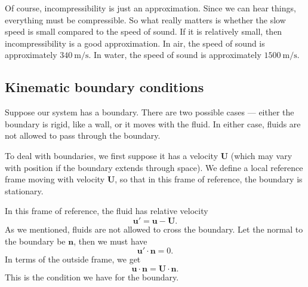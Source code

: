 \documentclass[a4paper]{article}
\begin{document}
Of course, incompressibility is just an approximation. Since we can hear things, everything must be compressible. So what really matters is whether the slow speed is small compared to the speed of sound. If it is relatively small, then incompressibility is a good approximation. In air, the speed of sound is approximately $\SI{340}{\meter\per\second}$. In water, the speed of sound is approximately $\SI{1500}{\meter\per\second}$.

\subsection{Kinematic boundary conditions}
Suppose our system has a boundary. There are two possible cases --- either the boundary is rigid, like a wall, or it moves with the fluid. In either case, fluids are not allowed to pass through the boundary.

To deal with boundaries, we first suppose it has a velocity $\mathbf{U}$ (which may vary with position if the boundary extends through space). We define a local reference frame moving with velocity $\mathbf{U}$, so that in this frame of reference, the boundary is stationary.

In this frame of reference, the fluid has relative velocity
\[
  \mathbf{u}' = \mathbf{u} - \mathbf{U}.
\]
As we mentioned, fluids are not allowed to cross the boundary. Let the normal to the boundary be $\mathbf{n}$, then we must have
\[
  \mathbf{u}' \cdot \mathbf{n} = 0.
\]
In terms of the outside frame, we get
\[
  \mathbf{u}\cdot \mathbf{n} = \mathbf{U} \cdot \mathbf{n}.
\]
This is the condition we have for the boundary.
\end{document}
